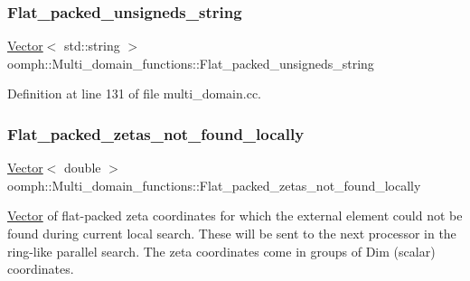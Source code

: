 \mbox{\label{namespaceoomph_1_1Multi__domain__functions_a910c65c750d007e76f9175993179d151}} 
\subsubsection{\texorpdfstring{Flat\+\_\+packed\+\_\+unsigneds\+\_\+string}{Flat\_packed\_unsigneds\_string}}
{\footnotesize\ttfamily \hyperlink{classoomph_1_1Vector}{Vector}$<$ std\+::string $>$ oomph\+::\+Multi\+\_\+domain\+\_\+functions\+::\+Flat\+\_\+packed\+\_\+unsigneds\+\_\+string}



Definition at line 131 of file multi\+\_\+domain.\+cc.

\mbox{\label{namespaceoomph_1_1Multi__domain__functions_a880374b0f685eeddca0c70b5a5d40a85}} 
\subsubsection{\texorpdfstring{Flat\+\_\+packed\+\_\+zetas\+\_\+not\+\_\+found\+\_\+locally}{Flat\_packed\_zetas\_not\_found\_locally}}
{\footnotesize\ttfamily \hyperlink{classoomph_1_1Vector}{Vector}$<$ double $>$ oomph\+::\+Multi\+\_\+domain\+\_\+functions\+::\+Flat\+\_\+packed\+\_\+zetas\+\_\+not\+\_\+found\+\_\+locally}



\hyperlink{classoomph_1_1Vector}{Vector} of flat-\/packed zeta coordinates for which the external element could not be found during current local search. These will be sent to the next processor in the ring-\/like parallel search. The zeta coordinates come in groups of Dim (scalar) coordinates. 



